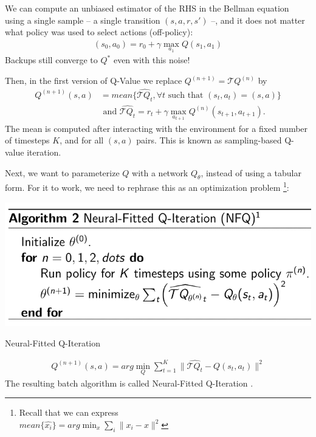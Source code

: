 \documentclass{tufte-handout}
\begin{document}
We can compute an unbiased estimator of the RHS in the Bellman equation using a single sample -- a single transition $(s,a,r,s')$ --, and it does not matter what policy was used to select actions (off-policy): 
  \begin{align*}
    [\widehat{\mathcal{T} Q}](s_0,a_0) =  r_0 + \gamma \max_{a_{1}} Q(s_{1},a_{1})
  \end{align*}
 Backups still converge to $Q^*$ even with this noise! \cite{Jaakkola1994-nc}

Then, in the first version of Q-Value we replace $Q^{(n+1)} = \mathcal{T} Q^{(n)}$ by 
  \begin{align*}
  Q^{(n+1)}(s,a) &= mean \{\widehat{\mathcal{T} Q_t}, \forall t \text{ such that } (s_t,a_t)=(s,a)\}  \\
  & \text{ and } \widehat{\mathcal{T} Q_t} = r_t + \gamma \max_{a_{t+1}} Q^{(n)}(s_{t+1},a_{t+1}).
  \end{align*}
The mean is computed after interacting with the environment for a fixed number of timesteps $K$, and for all $(s,a)$ pairs.  This is known as sampling-based Q-value iteration.

Next, we want to parameterize $Q$ with a network $Q_\theta$, instead of using a tabular form. For it to work, we need to rephrase this as an optimization problem \footnote{Recall that we can express \\  $mean\{\hat{x_i}\} = arg \min_x \sum_i \| x_i-x\|^2$}:
\begin{marginfigure}[0cm]
  \includegraphics[width=\linewidth]{nfq}
  \caption{Neural-Fitted Q-Iteration}
\end{marginfigure}
\vspace{-20pt}
  \begin{align*}
    Q^{(n+1)}(s,a) = arg \min_{Q} \sum_{t=1}^{K} \| \widehat{\mathcal{T} Q_t} - Q(s_t,a_t) \|^2
  \end{align*}
The resulting batch algorithm is called Neural-Fitted Q-Iteration \cite{Riedmiller2005-lk}.
\end{document}

